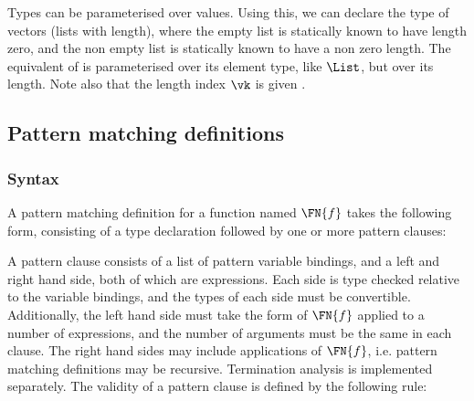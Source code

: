 Types can be
parameterised over values. Using this, we can declare the type of
vectors (lists with length), where the empty list is statically known
to have length zero, and the non empty list is statically known to
have a non zero length. The \TT{} equivalent of  is parameterised over its element type,
like $\List$, but  over its length. Note also that the length
index $\vk$ is given .

\DM{
\AR{
\Data\hg\Vect\:(\va\Hab\Type)\Hab\Nat\to\Type\hg\Where \\
\hg\hg\ARd{
& \nil\Hab\Vect\:\va\:\Z\\
\mid & (\cons)\Hab\fbind{\vk}{\Nat}{
\fbind{\vx}{\va}{\fbind{\vxs}{\Vect\:\va\:\vk}{\Vect\:\va\:(\suc\:\vk)}}
}
}
}
}

\subsection{Pattern matching definitions}

\label{sect:patdefs}

\subsubsection{Syntax}

A pattern matching definition for a function named $\FN{f}$ takes the following form,
consisting of a type declaration followed by one or more pattern clauses:


A pattern clause consists of a list of pattern variable bindings, 
and a left and right hand side, both of which
are \TT{} expressions. Each side is type checked relative to the variable bindings,
and the types of each side must be convertible. Additionally, the
left hand side must take the form of $\FN{f}$ applied to a number of \TT{} expressions,
and the number of arguments must be the same in each clause. The right hand
sides may include applications of $\FN{f}$, i.e. pattern matching definitions may
be recursive. Termination analysis is implemented separately. The validity of a pattern
clause is defined by the following rule:


